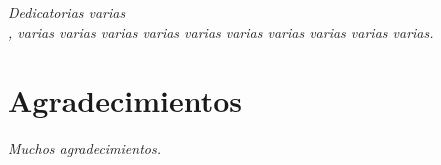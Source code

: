 
\thispagestyle{empty}
\vspace*{4cm}
\begin{flushright}
\textit{Dedicatorias varias \\,
varias varias varias varias varias varias varias varias varias varias.}
\end{flushright}




\cleardoublepage
\chapter*{Agradecimientos}


\vspace{10mm}
\textit{Muchos agradecimientos.}


